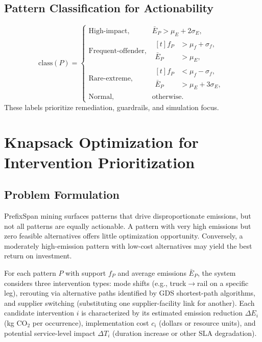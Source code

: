 \documentclass[conference]{IEEEtran}
\begin{document}
\subsection{Pattern Classification for Actionability}
\begin{equation}
\label{eq:class}
\mathrm{class}(P)=
\begin{cases}
\text{High-impact}, & \bar{E}_P>\mu_E+2\sigma_E, \\
\text{Frequent-offender}, & \begin{aligned}[t]
  f_P &> \mu_f+\sigma_f, \\
  \bar{E}_P &> \mu_E,
\end{aligned} \\
\text{Rare-extreme}, & \begin{aligned}[t]
  f_P &< \mu_f-\sigma_f, \\
  \bar{E}_P &> \mu_E+3\sigma_E,
\end{aligned} \\
\text{Normal}, & \text{otherwise.}
\end{cases}
\end{equation}
These labels prioritize remediation, guardrails, and simulation focus.

\section{Knapsack Optimization for Intervention Prioritization}
\subsection{Problem Formulation}
PrefixSpan mining surfaces patterns that drive disproportionate emissions, but not all patterns are equally actionable. A pattern with very high emissions but zero feasible alternatives offers little optimization opportunity. Conversely, a moderately high-emission pattern with low-cost alternatives may yield the best return on investment.

For each pattern $P$ with support $f_P$ and average emissions $\bar{E}_P$, the system considers three intervention types: mode shifts (e.g., truck$\to$rail on a specific leg), rerouting via alternative paths identified by GDS shortest-path algorithms, and supplier switching (substituting one supplier-facility link for another). Each candidate intervention $i$ is characterized by its estimated emission reduction $\Delta E_i$ (kg CO$_2$ per occurrence), implementation cost $c_i$ (dollars or resource units), and potential service-level impact $\Delta T_i$ (duration increase or other SLA degradation).
\end{document}
